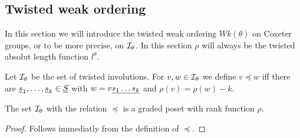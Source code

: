 \subsection{Twisted weak ordering}
\label{sec:twisted-involutions-twisted-weak-ordering}

In this section we will introduce the twisted weak ordering $Wk(\theta)$ on Coxeter groups, or to be more precise, on $\mathcal{I}_{\theta}$. In this section $\rho$ will always be the twisted absolut length function $l^\theta$.

\begin{defi}
	Let $\mathcal{I}_{\theta}$ be the set of twisted involutions. For $v,w \in \mathcal{I}_{\theta}$ we define $v \preceq w$ iff there are $\underline{s}_1, \ldots, \underline{s}_k \in \underline{S}$ with $w = v \underline{ s_1 \ldots s_k }$ and $\rho(v) = \rho(w) - k$.
\end{defi}

\begin{lemm}
	The set $\mathcal{I}_{\theta}$ with the relation $\preceq$ is a graded poset with rank function $\rho$.

	\begin{proof}
		Follows immediatly from the definition of $\preceq$.
	\end{proof}
\end{lemm}

\todo